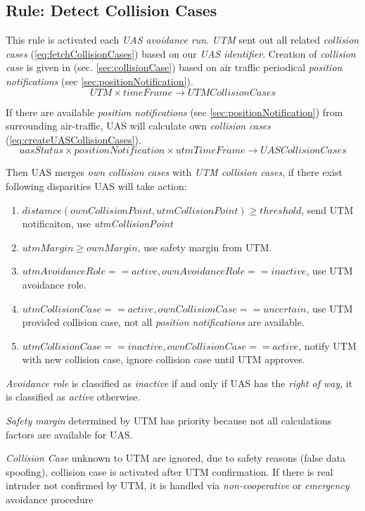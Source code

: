 \subsection{Rule: Detect Collision Cases}\label{sec:detectCollisionCases}
\noindent This rule is activated each \emph{UAS avoidance run}. \emph{UTM} sent out all related \emph{collision cases} (\ref{eq:fetchCollisionCases}) based on our \emph{UAS identifier}. Creation of \emph{collision case} is given in (sec. \ref{sec:collisionCase}) based on air traffic periodical \emph{position notifications} (sec \ref{sec:positionNotification}).
\begin{equation}\label{eq:fetchCollisionCases}
    UTM\times timeFrame \to UTMCollisionCases
\end{equation}

\noindent If there are available \emph{position notifications} (sec \ref{sec:positionNotification}) from surrounding air-traffic, UAS will calculate own \emph{collision cases} (\ref{eq:createUASCollisionCases}).
\begin{equation}\label{eq:createUASCollisionCases}
    uasStatus\times positionNotification\times utmTimeFrame\to UASCollisionCases
\end{equation}

\noindent Then UAS merges \emph{own collision cases} with \emph{UTM collision cases}, if there exist following disparities UAS will take action:
\begin{enumerate}
    \item $distamce(ownCollisionPoint,utmCollisionPoint)\ge threshold$, send UTM notificaiton, use \emph{utmCollisionPoint}
    \item $utmMargin \ge ownMargin$, use safety margin from UTM.
    \item $utmAvoidanceRole == active, ownAvoidanceRole == inactive$, use UTM avoidance role.
    \item $utmCollisionCase == active, ownCollisionCase == uncertain$, use UTM provided collision case, not all \emph{position notifications} are available. 
    \item $utmCollisionCase == inactive, ownCollisionCase == active$, notify UTM with new collision case, ignore collision case until UTM approves.
\end{enumerate}
\begin{note}
    \emph{Avoidance role} is classified as \emph{inactive} if and only if UAS has the  \emph{right of way}, it is classified as \emph{active} otherwise.
    
    \emph{Safety margin} determined by UTM has priority because not all calculations factors are available for UAS.
    
    \emph{Collision Case} unknown to UTM are ignored, due to safety reasons (false data spoofing), collision case is activated after UTM confirmation. If there is real intruder not confirmed by UTM, it is handled via \emph{non-cooperative} or \emph{emergency} avoidance procedure
\end{note}

